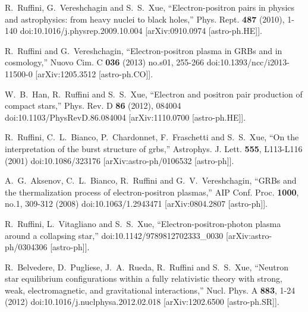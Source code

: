 \begin{thebibliography}{99}

R.~Ruffini, G.~Vereshchagin and S.~S.~Xue,
``Electron-positron pairs in physics and astrophysics: from heavy nuclei to black holes,''
Phys. Rept. \textbf{487} (2010), 1-140
doi:10.1016/j.physrep.2009.10.004
[arXiv:0910.0974 [astro-ph.HE]].

R.~Ruffini and G.~Vereshchagin,
``Electron-positron plasma in GRBs and in cosmology,''
Nuovo Cim. C \textbf{036} (2013) no.s01, 255-266
doi:10.1393/ncc/i2013-11500-0
[arXiv:1205.3512 [astro-ph.CO]].

W.~B.~Han, R.~Ruffini and S.~S.~Xue,
``Electron and positron pair production of compact stars,''
Phys. Rev. D \textbf{86} (2012), 084004
doi:10.1103/PhysRevD.86.084004
[arXiv:1110.0700 [astro-ph.HE]].

R.~Ruffini, C.~L.~Bianco, P.~Chardonnet, F.~Fraschetti and S.~S.~Xue,
``On the interpretation of the burst structure of grbs,''
Astrophys. J. Lett. \textbf{555}, L113-L116 (2001)
doi:10.1086/323176
[arXiv:astro-ph/0106532 [astro-ph]].

A.~G.~Aksenov, C.~L.~Bianco, R.~Ruffini and G.~V.~Vereshchagin,
``GRBs and the thermalization process of electron-positron plasmas,''
AIP Conf. Proc. \textbf{1000}, no.1, 309-312 (2008)
doi:10.1063/1.2943471
[arXiv:0804.2807 [astro-ph]].


R.~Ruffini, L.~Vitagliano and S.~S.~Xue,
``Electron-positron-photon plasma around a collapsing star,''
doi:10.1142/9789812702333\_0030
[arXiv:astro-ph/0304306 [astro-ph]].

R.~Belvedere, D.~Pugliese, J.~A.~Rueda, R.~Ruffini and S.~S.~Xue,
``Neutron star equilibrium configurations within a fully relativistic theory with strong, weak, electromagnetic, and gravitational interactions,''
Nucl. Phys. A \textbf{883}, 1-24 (2012)
doi:10.1016/j.nuclphysa.2012.02.018
[arXiv:1202.6500 [astro-ph.SR]].


\end{thebibliography}
